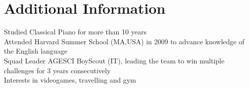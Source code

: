 \documentclass[letterpaper,11pt]{article}
\begin{document}
\section{Additional Information}
\begin{itemize}[leftmargin=0.15in, label={}]
   \small{\item{
    {Studied Classical Piano for more than 10 years} \\
    {Attended Harvard Summer School (MA,USA) in 2009 to advance knowledge of the English language} \\
    {Squad Leader AGESCI BoyScout (IT), leading the team to win multiple challenges for 3 years consecutively} \\
    {Interests in videogames, travelling and gym}
   }} 
\end{itemize}
\end{document}
